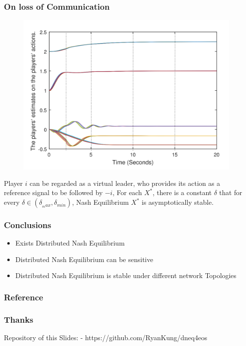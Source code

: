 \documentclass[notheorems, aspectratio=54]{beamer}
\begin{document}
\begin{frame}
  \frametitle{On loss of Communication}
    \begin{figure}[H]
    \centering
    \includegraphics[height=0.4\linewidth]{lose-com.png}
  \end{figure}
    Player $i$ can be regarded as a virtual leader, who provides its action as a reference signal to be followed by $-i$,   For each $X^*$, there is a constant $\delta$ that for every $\delta \in (\delta_{_max}, \delta_{min})$, Nash Equilibrium $X^*$ is asymptotically stable. \cite{8093754}
\end{frame}

\begin{frame}
  \frametitle{Conclusions}
    \begin{itemize}
    \item Exists Distributed Nash Equilibrium
    \item Distributed Nash Equilibrium can be sensitive
    \item Distributed Nash Equilibrium is stable under different network Topologies
    \end{itemize}
  \end{frame}

  
  \begin{frame}
    \frametitle{Reference}
  
  
\end{frame}

\begin{frame}
  \frametitle{Thanks}
  Repository of this Slides:\newline
  - https://github.com/RyanKung/dneq4eos \quad
\end{frame}
\end{document}

